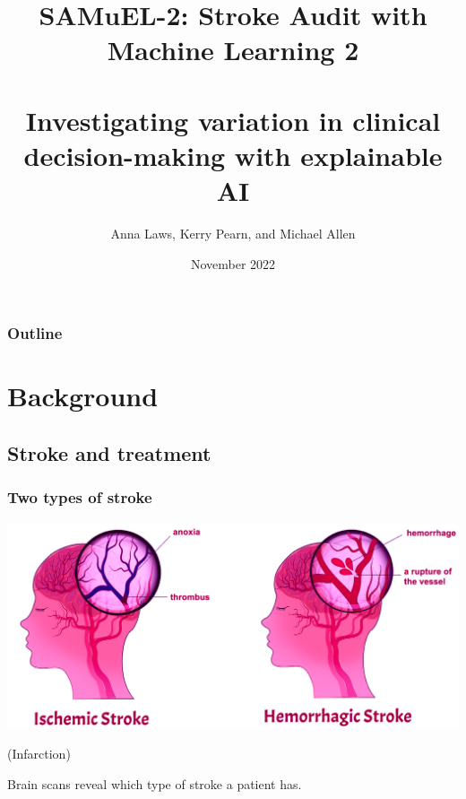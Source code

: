 \documentclass[xcolor={usenames,dvipsnames}]{beamer}
\title{SAMuEL-2: Stroke Audit with Machine Learning 2\\\phantom{blank line please}\\Investigating variation in clinical decision-making with explainable AI}
\author[Anna Laws]{Anna Laws, Kerry Pearn, and Michael Allen}
\institute{University of Exeter Medical School, PenCHORD}
\date{November 2022}%
\begin{document}





\begin{frame}
\frametitle{Outline}
\tableofcontents
\end{frame}


\section{Background}
\subsection{Stroke and treatment} %




\begin{frame}
\frametitle{Two types of stroke}
\includegraphics[width=1.0\textwidth]{./images/stroke_types}

\phantom{gap ga} (Infarction)

\vspace{2em}
Brain scans reveal which type of stroke a patient has. 

\end{frame}

\end{document}
